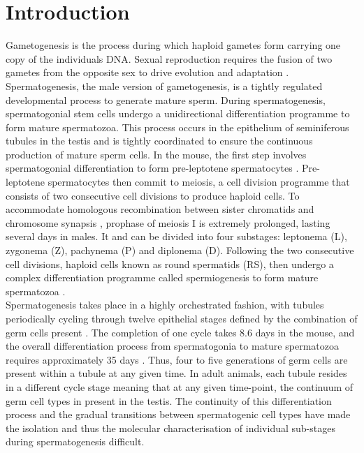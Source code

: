 
\section{Introduction}

Gametogenesis is the process during which haploid gametes form carrying one copy of the individuals DNA. Sexual reproduction requires the fusion of two gametes from the opposite sex to drive evolution and adaptation \citep{McDonald2016}. Spermatogenesis, the male version of gametogenesis, is a tightly regulated developmental process to generate mature sperm. 
During spermatogenesis, spermatogonial stem cells undergo a unidirectional differentiation programme to form mature spermatozoa. This process occurs in the epithelium of seminiferous tubules in the testis and is tightly coordinated to ensure the continuous production of mature sperm cells. In the mouse, the first step involves spermatogonial differentiation to form pre-leptotene spermatocytes \citep{Oakberg1971, DeRooij1973, DeRooij2000}. Pre-leptotene spermatocytes then commit to meiosis, a cell division programme that consists of two consecutive cell divisions to produce haploid cells. To accommodate homologous recombination between sister chromatids and chromosome synapsis \citep{Marston2004}, prophase of meiosis I is extremely prolonged, lasting several days in males. It and can be divided into four substages: leptonema (L), zygonema (Z), pachynema (P) and diplonema (D). Following the two consecutive cell divisions, haploid cells known as round spermatids (RS), then undergo a complex differentiation programme called spermiogenesis to form mature spermatozoa \citep{Oakberg1956}. \\

Spermatogenesis takes place in a highly orchestrated fashion, with tubules periodically cycling through twelve epithelial stages defined by the combination of germ cells present \citep{Oakberg1956}. The completion of one cycle takes 8.6 days in the mouse, and the overall differentiation process from spermatogonia to mature spermatozoa requires approximately 35 days \citep{Oakberg1956a}. Thus, four to five generations of germ cells are present within a tubule at any given time. In adult animals, each tubule resides in a different cycle stage meaning that at any given time-point, the continuum of germ cell types in present in the testis. The continuity of this differentiation process and the gradual transitions between spermatogenic cell types have made the isolation and thus the molecular characterisation of individual sub-stages during spermatogenesis difficult.\\

